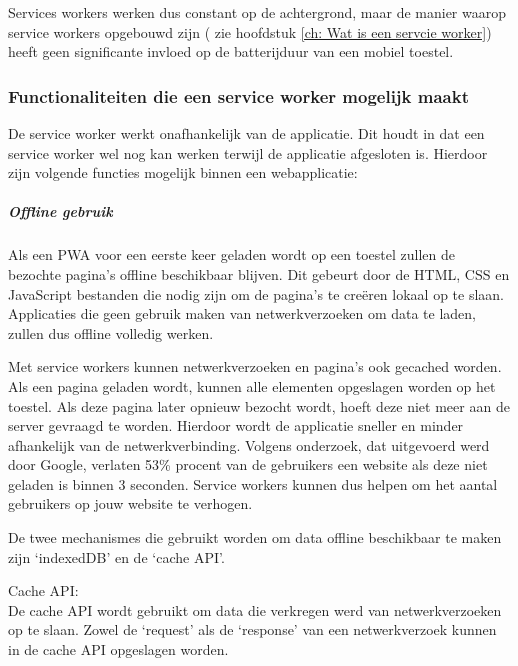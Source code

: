		
		Services workers werken dus constant op de achtergrond, maar de manier waarop service workers opgebouwd zijn (
		zie hoofdstuk \ref{ch: Wat is een servcie worker}) heeft geen significante invloed op de batterijduur van een mobiel toestel.
		\autocite{Malavolta2016}
	
	
	\subsubsection{Functionaliteiten die een service worker mogelijk maakt}
	\label{ch: Functionaliteiten die een serivce worker mogelijk maakt}
	
		De service worker werkt onafhankelijk van de applicatie. Dit houdt in dat een service worker wel nog kan werken terwijl de applicatie afgesloten is. Hierdoor zijn volgende functies mogelijk binnen een webapplicatie:
	
		
		
		\subparagraph{Offline gebruik}
		
			Als een PWA voor een eerste keer geladen wordt op een toestel zullen de bezochte pagina's offline beschikbaar blijven. Dit gebeurt door de  HTML, CSS en JavaScript bestanden die nodig zijn om de pagina's te creëren lokaal op te slaan. Applicaties die geen gebruik maken van netwerkverzoeken om data te laden, zullen dus offline volledig werken.
			
			Met service workers kunnen netwerkverzoeken en pagina's ook gecached worden. Als een pagina geladen wordt, kunnen alle elementen opgeslagen worden op het toestel. Als deze pagina later opnieuw bezocht wordt, hoeft deze niet meer aan de server gevraagd te worden. Hierdoor wordt de applicatie sneller en minder afhankelijk van de netwerkverbinding.
			Volgens onderzoek, dat uitgevoerd werd door Google, verlaten 53\% procent van de gebruikers een website als deze niet geladen is binnen 3 seconden. Service workers kunnen dus helpen om het aantal gebruikers op jouw website te verhogen.
			\autocite{Google2017}
			
			De twee mechanismes die gebruikt worden om data offline beschikbaar te maken zijn ‘indexedDB’ en de ‘cache API’.
			\autocite{Osmani2019}
			\autocite{Mozilla2020a}
			
			Cache API: \\

				De cache API wordt gebruikt om data die verkregen werd van netwerkverzoeken op te slaan. Zowel de ‘request’ als de ‘response’ van een netwerkverzoek kunnen in de cache API opgeslagen worden.
				\autocite{Scales2019}

